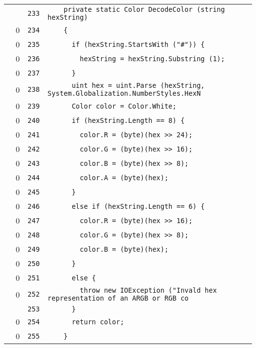 \documentclass[a4paper,10pt]{article}
\begin{document}
\begin{longtable}[l]{lrrl}
\cellcolor{gray} &  & \verb~233~ & \verb~    private static Color DecodeColor (string hexString)~\\
\cellcolor{red} & 0 & \verb~234~ & \verb~    {~\\
\cellcolor{red} & 0 & \verb~235~ & \verb~      if (hexString.StartsWith ("#")) {~\\
\cellcolor{red} & 0 & \verb~236~ & \verb~        hexString = hexString.Substring (1);~\\
\cellcolor{red} & 0 & \verb~237~ & \verb~      }~\\
\cellcolor{red} & 0 & \verb~238~ & \verb~      uint hex = uint.Parse (hexString, System.Globalization.NumberStyles.HexN~\\
\cellcolor{red} & 0 & \verb~239~ & \verb~      Color color = Color.White;~\\
\cellcolor{red} & 0 & \verb~240~ & \verb~      if (hexString.Length == 8) {~\\
\cellcolor{red} & 0 & \verb~241~ & \verb~        color.R = (byte)(hex >> 24);~\\
\cellcolor{red} & 0 & \verb~242~ & \verb~        color.G = (byte)(hex >> 16);~\\
\cellcolor{red} & 0 & \verb~243~ & \verb~        color.B = (byte)(hex >> 8);~\\
\cellcolor{red} & 0 & \verb~244~ & \verb~        color.A = (byte)(hex);~\\
\cellcolor{red} & 0 & \verb~245~ & \verb~      }~\\
\cellcolor{red} & 0 & \verb~246~ & \verb~      else if (hexString.Length == 6) {~\\
\cellcolor{red} & 0 & \verb~247~ & \verb~        color.R = (byte)(hex >> 16);~\\
\cellcolor{red} & 0 & \verb~248~ & \verb~        color.G = (byte)(hex >> 8);~\\
\cellcolor{red} & 0 & \verb~249~ & \verb~        color.B = (byte)(hex);~\\
\cellcolor{red} & 0 & \verb~250~ & \verb~      }~\\
\cellcolor{red} & 0 & \verb~251~ & \verb~      else {~\\
\cellcolor{red} & 0 & \verb~252~ & \verb~        throw new IOException ("Invald hex representation of an ARGB or RGB co~\\
\cellcolor{gray} &  & \verb~253~ & \verb~      }~\\
\cellcolor{red} & 0 & \verb~254~ & \verb~      return color;~\\
\cellcolor{red} & 0 & \verb~255~ & \verb~    }~\\

\end{longtable}
\end{document}
